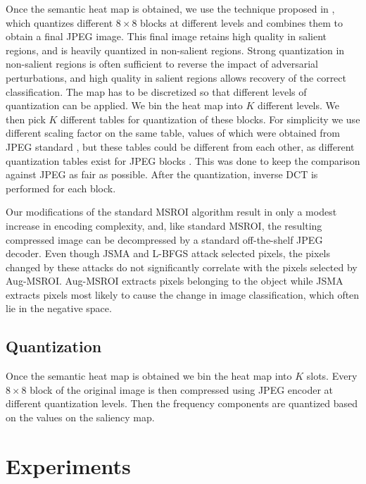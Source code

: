 Once the semantic heat map is obtained, we use the technique proposed in \cite{Prakash2017SemanticPI}, which quantizes different $8\times8$ blocks at different levels and combines them to obtain a final JPEG image. 
This final image retains high quality in salient regions, and is heavily quantized in non-salient regions.
Strong quantization in non-salient regions is often sufficient to reverse the impact of adversarial perturbations, and high quality in salient regions allows recovery of the correct classification.
The map has to be discretized so that different levels of quantization can be applied. 
We bin the heat map into $K$ different levels.
We then pick $K$ different tables for quantization of these blocks. 
For simplicity we use different scaling factor on the same table, values of which were obtained from JPEG standard \cite{wallace1992jpeg}, but these tables could be different from each other, as different quantization tables exist for JPEG blocks \cite{wang2001designing}.
This was done to keep the comparison against JPEG as fair as possible. After the quantization, inverse DCT is performed for each block. 


Our modifications of the standard MSROI algorithm result in only a modest increase in encoding complexity, and, like standard MSROI, the resulting compressed image can be decompressed by a standard off-the-shelf JPEG decoder.
Even though JSMA and L-BFGS attack selected pixels, the pixels changed by these attacks do not significantly correlate with the pixels selected by Aug-MSROI. Aug-MSROI extracts pixels belonging to the object while JSMA extracts pixels most likely to cause the change in image classification, which often lie in the negative space.

\subsection{Quantization}
Once the semantic heat map is obtained we bin the heat map into $K$ slots. 
Every $8\times8$ block of the original image is then compressed using JPEG encoder at different quantization levels.
Then the frequency components are quantized based on the values on the saliency map.

\section{Experiments}

